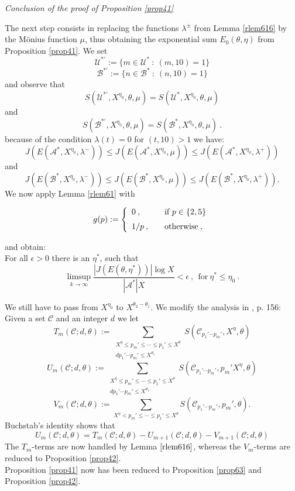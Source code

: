 \documentclass{amsart}
\numberwithin{equation}{subsection}
\begin{document}
\textit{Conclusion of the proof of Proposition \ref{prop41}}

\noindent The next step consists in replacing the functions $\lambda^{\pm}$ from Lemma \ref{rlem616} by the M\"onius function $\mu$, thus obtaining the exponential sum $E_0(\theta, \eta)$ from Proposition \ref{prop41}. We set
$$\mathcal{U}^{*'}:=\{ m\in \mathcal{U}^*\::\: (m, 10)=1\}$$
$$\mathcal{B}^{*'}:=\{ n\in \mathcal{B}^*\::\: (n, 10)=1\}$$
and observe that
$$S(\mathcal{U}^{*'}, X^{\eta_0}, \theta, \mu)=S(\mathcal{U}^*, X^{\eta_0}, \theta, \mu)$$
and
$$S(\mathcal{B}^{*'}, X^{\eta_0}, \theta, \mu)=S(\mathcal{B}^*, X^{\eta_0}, \theta, \mu)\:.$$
because of the condition $\lambda(t)=0$ for $(t, 10)>1$ we have:
\[
J(E(\mathcal{A}^*, X^{\eta_0}, \lambda^-))\leq J(E(\mathcal{A}^*, X^{\eta_0}, \mu))\leq J(E(\mathcal{A}^*, X^{\eta_0}, \lambda^+)) \tag{6.32}
\]
and
\[
J(E(\mathcal{B}^*, X^{\eta_0}, \lambda^-))\leq J(E(\mathcal{B}^*, X^{\eta_0}, \mu))\leq J(E(\mathcal{B}^*, X^{\eta_0}, \lambda^+)). \tag{6.33}
\]
We now apply Lemma \ref{rlem61} with 

\begin{eqnarray}
g(p):=\left\{ 
  \begin{array}{l l}
   0\:, & \quad \text{if $p\in \{2, 5\}$}\vspace{2mm}\\ 
    1/p\:, & \quad \text{otherwise}\:,\\
  \end{array} \right.
\nonumber
\end{eqnarray}

and obtain:\\
For all $\epsilon>0$ there is an $\eta^*$, such that
$$\limsup_{k\rightarrow\infty} \frac{|J(E(\theta, \eta^*))|\log X}{|\mathcal{A}^*|X}< \epsilon\:,\ \ \text{for}\ \eta^*\leq \eta_0\:.$$

We still have to pass from $X^{\eta_0}$ to $X^{\theta_2-\theta_1}$. We modify the analysis in \cite{maynard}, p. 156:\\
Given a set $\mathcal{C}$ and an integer $d$ we let
$$T_m(\mathcal{C}; d, \theta):=\sum_{\substack{X^\eta\leq p_m'\leq \cdots \leq p_1'\leq X^\theta \\ d{p_1'\cdots p_m'}\leq X^{\theta_1}}} S(\mathcal{C}_{p_1'\cdots p_m'}, X^\eta, \theta) $$
$$U_m(\mathcal{C}; d, \theta):=\sum_{\substack{X^\eta\leq p_m'\leq \cdots \leq p_1'\leq X^\theta \\ d{p_1'\cdots p_m'}\leq X^{\theta_1}}} S(\mathcal{C}_{p_1'\cdots p_m'}, p_m'X^\eta, \theta) $$
$$V_m(\mathcal{C}; d, \theta):=\sum_{X^\eta< p_m'\leq \cdots \leq p_1'\leq X^\theta } S(\mathcal{C}_{p_1'\cdots p_m'}, p_m', \theta) .$$
Buchstab's identity shows that 
$$U_m(\mathcal{C}; d, \theta)=T_m(\mathcal{C}; d, \theta)-U_{m+1}(\mathcal{C}; d, \theta)-V_{m+1}(\mathcal{C}; d, \theta)$$
The $T_m$-terms are now handled by Lemma $\ref{rlem616}$, whereas the $V_m$-terms are reduced to Proposition \ref{prop42}.\\
Proposition \ref{prop41} now has been reduced to Proposition \ref{prop63} and Proposition \ref{prop42}.
\end{document}
